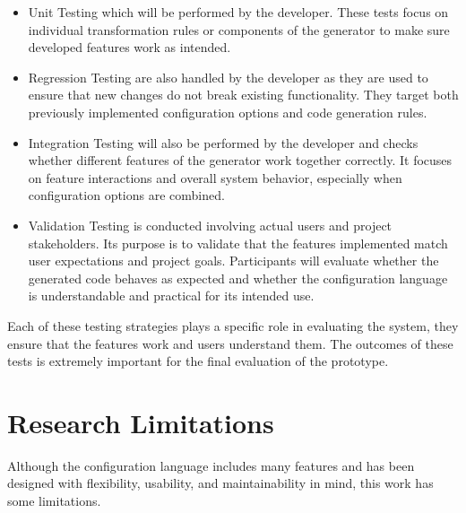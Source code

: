 \begin{itemize}
	\item Unit Testing which will be performed by the developer. These tests focus on individual transformation rules or components of the generator to make sure developed features work as intended.
	\item Regression Testing are also handled by the developer as they are used to ensure that new changes do not break existing functionality. They target both previously implemented configuration options and code generation rules.
	\item Integration Testing will also be performed by the developer and checks whether different features of the generator work together correctly. It focuses on feature interactions and overall system behavior, especially when configuration options are combined.
	\item Validation Testing is conducted involving actual users and project stakeholders. Its purpose is to validate that the features implemented match user expectations and project goals. Participants will evaluate whether the generated code behaves as expected and whether the configuration language is understandable and practical for its intended use.
\end{itemize}

Each of these testing strategies plays a specific role in evaluating the system, they ensure that the features work and users understand them. The outcomes of these tests is extremely important for the final evaluation of the prototype.

\section{Research Limitations}
\label{sec:research_limitations}

Although the configuration language includes many features and has been designed with flexibility, usability, and maintainability in mind, this work has some limitations.

